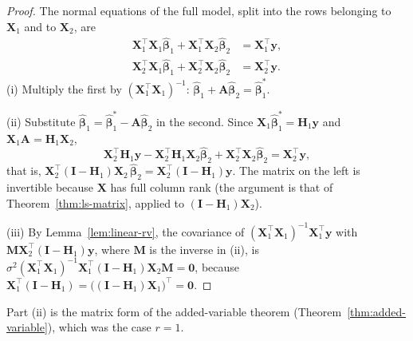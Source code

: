 \documentclass[11pt,a4paper]{article}
\numberwithin{equation}{section}
\theoremstyle{definition}
\begin{document}
\begin{proof}
The normal equations of the full model, split into the rows belonging to $\mathbf{X}_1$ and to
$\mathbf{X}_2$, are
\begin{align*}
\mathbf{X}_1^\top\mathbf{X}_1\hat{\boldsymbol\beta}_1 + \mathbf{X}_1^\top\mathbf{X}_2\hat{\boldsymbol\beta}_2 &= \mathbf{X}_1^\top\mathbf{y} , \\
\mathbf{X}_2^\top\mathbf{X}_1\hat{\boldsymbol\beta}_1 + \mathbf{X}_2^\top\mathbf{X}_2\hat{\boldsymbol\beta}_2 &= \mathbf{X}_2^\top\mathbf{y} .
\end{align*}
(i) Multiply the first by $(\mathbf{X}_1^\top\mathbf{X}_1)^{-1}$:
$\hat{\boldsymbol\beta}_1 + \mathbf{A}\hat{\boldsymbol\beta}_2 = \hat{\boldsymbol\beta}_1^*$.

(ii) Substitute $\hat{\boldsymbol\beta}_1 = \hat{\boldsymbol\beta}_1^* - \mathbf{A}\hat{\boldsymbol\beta}_2$ in the second. Since
$\mathbf{X}_1\hat{\boldsymbol\beta}_1^* = \mathbf{H}_1\mathbf{y}$ and $\mathbf{X}_1\mathbf{A} = \mathbf{H}_1\mathbf{X}_2$,
\[
\mathbf{X}_2^\top\mathbf{H}_1\mathbf{y} - \mathbf{X}_2^\top\mathbf{H}_1\mathbf{X}_2\hat{\boldsymbol\beta}_2 + \mathbf{X}_2^\top\mathbf{X}_2\hat{\boldsymbol\beta}_2 = \mathbf{X}_2^\top\mathbf{y} ,
\]
that is, $\mathbf{X}_2^\top(\mathbf{I} - \mathbf{H}_1)\mathbf{X}_2\,\hat{\boldsymbol\beta}_2 = \mathbf{X}_2^\top(\mathbf{I} - \mathbf{H}_1)\mathbf{y}$. The matrix on
the left is invertible because $\mathbf{X}$ has full column rank (the argument is that of
Theorem~\ref{thm:ls-matrix}, applied to $(\mathbf{I} - \mathbf{H}_1)\mathbf{X}_2$).

(iii) By Lemma~\ref{lem:linear-rv}, the covariance of
$(\mathbf{X}_1^\top\mathbf{X}_1)^{-1}\mathbf{X}_1^\top\mathbf{y}$ with $\mathbf{M}\mathbf{X}_2^\top(\mathbf{I} - \mathbf{H}_1)\mathbf{y}$, where
$\mathbf{M}$ is the inverse in (ii), is
$\sigma^2(\mathbf{X}_1^\top\mathbf{X}_1)^{-1}\mathbf{X}_1^\top(\mathbf{I} - \mathbf{H}_1)\mathbf{X}_2\mathbf{M} = \mathbf{0}$, because
$\mathbf{X}_1^\top(\mathbf{I} - \mathbf{H}_1) = \bigl((\mathbf{I} - \mathbf{H}_1)\mathbf{X}_1\bigr)^\top = \mathbf{0}$.
\end{proof}

Part (ii) is the matrix form of the added-variable theorem (Theorem~\ref{thm:added-variable}), which
was the case $r = 1$.
\end{document}
